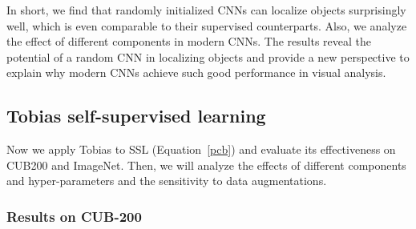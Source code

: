 \documentclass[letterpaper]{article} %
\begin{document}
In short, we find that randomly initialized CNNs can localize objects surprisingly well, which is even comparable to their supervised counterparts. Also, we analyze the effect of different components in modern CNNs. The results reveal the potential of a random CNN in localizing objects and provide a new perspective to explain why modern CNNs achieve such good performance in visual analysis.


\subsection{Tobias self-supervised learning} \label{sec:exp2}

Now we apply Tobias to SSL (Equation~\ref{pcb}) and evaluate its effectiveness on CUB200 and ImageNet. Then, we will analyze the effects of different components and hyper-parameters and the sensitivity to data augmentations.

\subsubsection{Results on CUB-200} \label{sec:cub}
\end{document}
